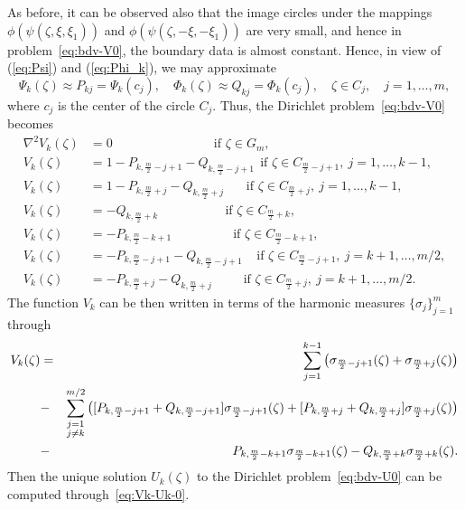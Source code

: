 As before, it can be observed also that the image circles under the mappings $\phi(\psi(\zeta,\xi,\xi_1))$ and $\phi(\psi(\zeta,-\xi,-\xi_1))$ are very small, and hence in problem~\eqref{eq:bdv-V0}, the boundary data is almost constant. Hence, in view of (\ref{eq:Psi}) and (\ref{eq:Phi_k}), we may approximate
\begin{equation}
\Psi_k(\zeta) \approx P_{kj}= \Psi_k(c_j), \quad  \Phi_k(\zeta) \approx Q_{kj}=\Phi_k(c_j), \quad \zeta \in C_j, \quad j=1,\ldots,m,
\end{equation} 
where $c_j$ is the center of the circle $C_j$. Thus, the Dirichlet problem~\eqref{eq:bdv-V0} becomes
\begin{subequations}\label{eq:bdv-V2}
	\begin{align}
	\label{eq:V2-Lap}
	\nabla^2 V_k(\zeta) &= 0 ~~~~~~~~~~~~~~~~~~~~~~~~~~~~~~~~~\:\:\; \mbox{if }\zeta\in G_m, \\
	\label{eq:V2-m}
	V_k(\zeta)&= 1-P_{k,\frac{m}{2}-j+1}-Q_{k,\frac{m}{2}-j+1} ~~ \mbox{if }\zeta\in C_{\frac{m}{2}-j+1}, ~ j=1,\ldots,k-1, \\
	\label{eq:V2+m}
	V_k(\zeta)&= 1-P_{k,\frac{m}{2}+j}-Q_{k,\frac{m}{2}+j} ~~~~~~~~ \mbox{if }\zeta\in C_{\frac{m}{2}+j}, ~ j=1,\ldots,k-1, \\
	\label{eq:V2-k'}
	V_k(\zeta)&= -Q_{k,\frac{m}{2}+k} ~~~~~~~~~~~~~~~~~~~~~~~~ \mbox{if }\zeta\in C_{\frac{m}{2}+k},  \\
	\label{eq:V2-k''}
	V_k(\zeta)&= -P_{k,\frac{m}{2}-k+1} ~~~~~~~~~~~~~~~~~~~~\:\: \mbox{if }\zeta\in C_{\frac{m}{2}-k+1},  \\
	\label{eq:V2-p}
	V_k(\zeta)&= -P_{k,\frac{m}{2}-j+1}-Q_{k,\frac{m}{2}-j+1}  ~~~~\: \mbox{if }\zeta\in C_{\frac{m}{2}-j+1}, ~ j=k+1,\ldots,m/2, \\
	\label{eq:V2+p}
	V_k(\zeta)&= -P_{k,\frac{m}{2}+j}-Q_{k,\frac{m}{2}+j}  ~~~~~~~~~~\; \mbox{if }\zeta\in C_{\frac{m}{2}+j}, ~ j=k+1,\ldots,m/2. 
	\end{align}
\end{subequations}
The function $V_k$ can be then written in terms of the harmonic measures $\{\sigma_j\}_{j=1}^m$ through
\begin{eqnarray}
\nonumber	V_k(\zeta)&=&
	\sum_{j=1}^{k-1}\left(\sigma_{\frac{m}{2}-j+1}(\zeta)+\sigma_{\frac{m}{2}+j}(\zeta)\right)\\
\label{eq:Vk-0}	&-&
	\sum_{\begin{subarray}{c} j=1\\j\ne k\end{subarray}}^{m/2} \left([P_{k,\frac{m}{2}-j+1}+Q_{k,\frac{m}{2}-j+1}]\sigma_{\frac{m}{2}-j+1}(\zeta)
	+[P_{k,\frac{m}{2}+j}+Q_{k,\frac{m}{2}+j}]\sigma_{\frac{m}{2}+j}(\zeta)\right)\\
\nonumber	&-&P_{k,\frac{m}{2}-k+1}\sigma_{\frac{m}{2}-k+1}(\zeta)-Q_{k,\frac{m}{2}+k}\sigma_{\frac{m}{2}+k}(\zeta).
\end{eqnarray}
Then the unique solution $U_k(\zeta)$ to the Dirichlet problem~\eqref{eq:bdv-U0} can be computed through~\eqref{eq:Vk-Uk-0}.

